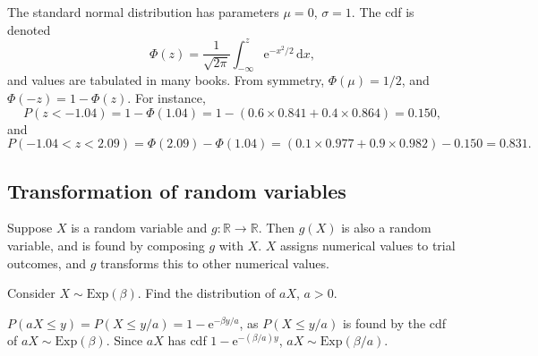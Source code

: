 \documentclass[letter-paper]{tufte-book}
\newenvironment{example}[1][Example]{\begin{trivlist}
\item[\hskip \labelsep {\bfseries #1}]}{\end{trivlist}}
\newcommand{\ex}{\mathrm{e}}
\begin{document}
\begin{example}
  The standard normal distribution has parameters $\mu=0$, $\sigma=1$. The cdf
  is denoted
  \begin{equation*}
    \Phi(z) = \frac{1}{\sqrt{2\pi}}\int_{-\infty}^z \ex^{-x^2/2}\, \mathrm{d}x,
  \end{equation*}
  and values are tabulated in many books. From symmetry, $\Phi(\mu)=1/2$, and
  $\Phi(-z) = 1-\Phi(z)$. For instance,
  \begin{equation*}
    P(z<-1.04) = 1-\Phi(1.04) = 1 - (0.6\times0.841 + 0.4\times0.864) = 0.150,
  \end{equation*}
  and
  \begin{equation*}
    P(-1.04<z<2.09) = \Phi(2.09)-\Phi(1.04) = 
    (0.1\times0.977 + 0.9\times0.982) - 0.150 = 0.831.
  \end{equation*}
\end{example}


\subsection{Transformation of random variables}

Suppose $X$ is a random variable and $g:\mathbb{R}\to\mathbb{R}$. Then $g(X)$ is
also a random variable, and is found by composing $g$ with $X$. $X$ assigns
numerical values to trial outcomes, and $g$ transforms this to other numerical
values.
\begin{example}
  Consider $X\sim\mbox{Exp}(\beta)$. Find the distribution of $aX$, $a>0$.
  
  $P(aX\leq y) = P(X\leq y/a) = 1-\ex^{-\beta y/a}$, as $P(X\leq y/a)$ is found
  by the cdf of $aX\sim\mbox{Exp}(\beta)$. Since $aX$ has cdf
  $1-\ex^{-(\beta/a)y}$, $aX\sim\mbox{Exp}(\beta/a)$.
\end{example}
\end{document}
